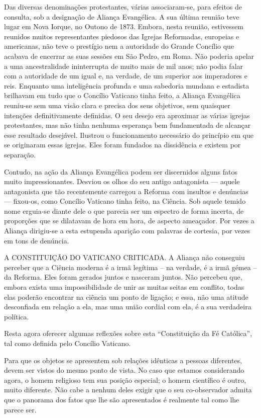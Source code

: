 \documentclass[11pt,a5paper,twoside,openany]{book}
\begin{document}
Das diversas denominações protestantes, várias associaram-se, para efeitos de consulta, sob a designação de Aliança Evangélica. A sua última reunião teve lugar em Nova Iorque, no Outono de 1873. Embora, nesta reunião, estivessem reunidos muitos representantes piedosos das Igrejas Reformadas, europeias e americanas, não teve o prestígio nem a autoridade do Grande Concílio que acabava de encerrar as suas sessões em São Pedro, em Roma. Não poderia apelar a uma ancestralidade ininterrupta de muito mais de mil anos; não podia falar com a autoridade de um igual e, na verdade, de um superior aos imperadores e reis. Enquanto uma inteligência profunda e uma sabedoria mundana e estadista brilhavam em tudo que o Concílio Vaticano tinha feito, a Aliança Evangélica reuniu-se sem uma visão clara e precisa dos seus objetivos, sem quaisquer intenções definitivamente definidas. O seu desejo era aproximar as várias igrejas protestantes, mas não tinha nenhuma esperança bem fundamentada de alcançar esse resultado desejável. Ilustrou o funcionamento necessário do princípio em que se originaram essas igrejas. Eles foram fundados na dissidência e existem por separação.

Contudo, na ação da Aliança Evangélica podem ser discernidos alguns fatos muito impressionantes. Desviou os olhos do seu antigo antagonista — aquele antagonista que tão recentemente carregou a Reforma com insultos e denúncias — fixou-os, como Concílio Vaticano tinha feito, na Ciência. Sob aquele temido nome erguia-se diante dele o que parecia ser um espectro de forma incerta, de proporções que se dilatavam de hora em hora, de aspecto ameaçador. Por vezes a Aliança dirigiu-se a esta estupenda aparição com palavras de cortesia, por vezes em tons de denúncia.

A CONSTITUIÇÃO DO VATICANO CRITICADA. A Aliança não conseguiu perceber que a Ciência moderna é a irmã legítima – na verdade, é a irmã gémea – da Reforma. Eles foram gerados juntos e nasceram juntos. Não percebeu que, embora exista uma impossibilidade de unir as muitas seitas em conflito, todas elas poderão encontrar na ciência um ponto de ligação; e essa, não uma atitude desconfiada em relação a ela, mas uma união cordial com ela, é a sua verdadeira política.

Resta agora oferecer algumas reflexões sobre esta “Constituição da Fé Católica”, tal como definida pelo Concílio Vaticano.

Para que os objetos se apresentem sob relações idênticas a pessoas diferentes, devem ser vistos do mesmo ponto de vista. No caso que estamos considerando agora, o homem religioso tem sua posição especial; o homem científico é outro, muito diferente. Não cabe a nenhum deles exigir que o seu co-observador admita que o panorama dos fatos que lhe são apresentados é realmente tal como lhe parece ser.
\end{document}
